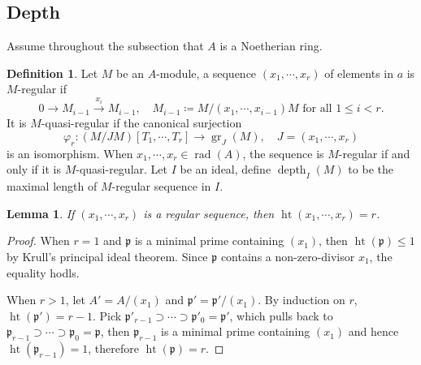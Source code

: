 \documentclass[leqno]{amsart}
\DeclareMathOperator{\gr}{gr}
\DeclareMathOperator{\hht}{ht}
\DeclareMathOperator{\rad}{rad}
\DeclareMathOperator{\depth}{depth}
\newcommand{\1}{\mathbf{1}}
\newcommand{\fp}{\mathfrak p}
\newtheorem{lem}[thm]{Lemma}
\theoremstyle{definition}
\newtheorem{defn}[thm]{Definition}
\theoremstyle{remark}
\begin{document}
\subsection{Depth}
Assume throughout the subsection that $A$ is a Noetherian ring.
\begin{defn}
Let $M$ be an  $A$-module, 
a sequence $(x_1,\cdots,x_r)$ of elements in $a$ is $M$-regular if
\[
	0\to M_{i-1}\xrightarrow{x_i} M_{i-1},\quad
	M_{i-1}\coloneqq M/(x_1,\cdots,x_{i-1})M \text{ for all }
	1\leq i<r.
\]
It is $M$-quasi-regular if the canonical surjection
\[
	\varphi_r\colon (M/JM)[T_1,\cdots,T_r]\to \gr_J(M),\quad
	J=(x_1,\cdots,x_r)
\]
is an isomorphism.
When $x_1,\cdots,x_{r}\in \rad(A)$,
the sequence is $M$-regular
if and only if it is $M$-quasi-regular.
Let $I$ be an ideal,
define $\depth_I(M)$ to be the maximal length
of $M$-regular sequence in $I$.
\end{defn}
\begin{lem}
	If $(x_1,\cdots,x_r)$ is a regular sequence, 
	then $\hht(x_1,\cdots,x_r)=r$.
\end{lem}
\begin{proof}
	When $r=1$ and $\fp$ is a minimal prime 
	containing  $(x_1)$, then
	$\hht(\fp)\leq 1$ by Krull's principal ideal theorem.
	Since  $\fp$ contains a non-zero-divisor $x_1$,
	the equality hodls.

	When  $r>1$, let  $A'=A/(x_1)$ and $\fp'=\fp'/(x_1)$.
	By induction on $r$,
	$\hht(\fp')=r-1$.
	Pick  $\fp'_{r-1}\supset \cdots\supset \fp'_0=\fp'$,
	which pulls back to 
	$\fp_{r-1}\supset \cdots\supset \fp_0=\fp$,
	then $\fp_{r-1}$ is a minimal prime containing $(x_1)$
	and hence  $\hht(\fp_{r-1})=1$,
	therefore $\hht(\fp)=r$.
\end{proof}
\end{document}
